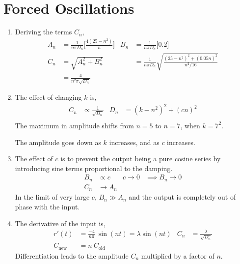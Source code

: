 \section{Forced Oscillations}

\begin{enumerate}
    \item Deriving the terms $ C_n $,
          \begin{align}
              A_n & = \frac{1}{n\pi D_n} \Bigg[ \frac{4(25 - n^2)}{n} \Bigg] &
              B_n & = \frac{1}{n\pi D_n} \Bigg[ 0.2 \Bigg]                     \\
              C_n & = \sqrt{A_n^2 + B_n^2}                                   &
                  & = \frac{1}{n\pi D_n}\sqrt{\frac{(25 - n^2)^2
              + (0.05n)^2}{n^2/16}}                                            \\
                  & = \frac{4}{n^2 \pi \sqrt{D_n}}
          \end{align}

    \item The effect of changing $ k $ is,
          \begin{align}
              C_n & \propto \frac{1}{\sqrt{D_n}} &
              D_n & = (k - n^2)^2 + (cn)^2         \\
          \end{align}
          The maximum in amplitude shifts from $ n = 5 $ to $ n = 7 $, when $ k = 7^2 $.
          \par The amplitude goes down as $ k $ increases, and as $ c $ increases.

    \item The effect of $ c $ is to prevent the output being a pure cosine series by
          introducing sine terms proportional to the damping.
          \begin{align}
              B_n             & \propto c                  &
              c \rightarrow 0 & \implies B_n \rightarrow 0   \\
              C_n             & \rightarrow A_n
          \end{align}
          In the limit of very large $ c $, $ B_n \gg  A_n $ and the output is completely
          out of phase with the input.

    \item The derivative of the input is,
          \begin{align}
              r'(t)          & = \frac{-4}{n\pi}\ \sin(nt) = \lambda \sin(nt) &
              C_n            & = \frac{\lambda}{\sqrt{D_n}}                     \\
              C_{\text{new}} & = n\ C_{\text{old}}
          \end{align}
          Differentiation leads to the amplitude $ C_n $  multiplied by a factor of
          $ n $.


\end{enumerate}
